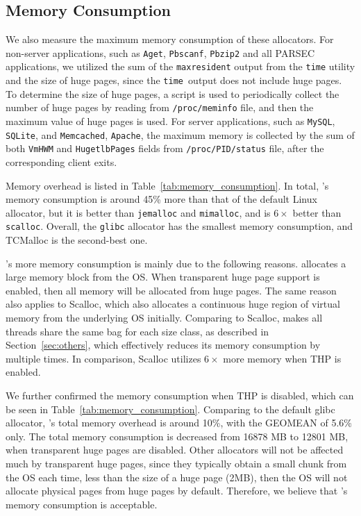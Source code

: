 \subsection{Memory Consumption}
\label{sec:memory}

We also measure the maximum memory consumption of these allocators. For non-server applications, such as \texttt{Aget}, \texttt{Pbscanf}, \texttt{Pbzip2} and all PARSEC applications, we utilized the sum of the \texttt{maxresident} output from the \texttt{time} utility and the size of huge pages, since the \texttt{time }output does not include huge pages. 
To determine the size of huge pages, a script is used to periodically collect the number of huge pages by reading from \texttt{/proc/meminfo} file, and then the maximum value of huge pages is used. 
For server applications, such as \texttt{MySQL}, \texttt{SQLite}, and \texttt{Memcached}, \texttt{Apache}, the maximum memory is collected by the sum of both \texttt{VmHWM} and \texttt{HugetlbPages} fields from \texttt{/proc/PID/status} file, after the corresponding client exits. 


% 

Memory overhead is listed in Table~\ref{tab:memory_consumption}. In total, \NM{}'s memory consumption is around 45\% more than that of the default Linux allocator, but it is better than \texttt{jemalloc} and  \texttt{mimalloc}, and is $6\times$ better than \texttt{scalloc}.  Overall, the \texttt{glibc} allocator has the smallest memory consumption, and TCMalloc is the second-best one. 
 
\NM{}'s more memory consumption is mainly due to the following reasons. \NM{} allocates a large memory block from the OS. When transparent huge page support is enabled, then all memory will be allocated from huge pages. The same reason also applies to Scalloc, which also allocates a continuous huge region of virtual memory from the underlying OS initially. Comparing to Scalloc, \NM{} makes all threads share the same bag for each size class, as described in Section~\ref{sec:others}, which effectively reduces its memory consumption by multiple times. In comparison, Scalloc utilizes $6\times$ more memory when THP is enabled.  

We further confirmed the memory consumption when THP is disabled, which can be seen in Table~\ref{tab:memory_consumption}. Comparing to the default glibc allocator, \NM{}'s total memory overhead is around 10\%, with the GEOMEAN of 5.6\% only. The total memory consumption is decreased from 16878 MB to 12801 MB,  when transparent huge pages are disabled. Other allocators will not be affected much by transparent huge pages, since they typically obtain a small chunk from the OS each time, less than the size of a huge page (2MB), then the OS will not allocate physical pages from huge pages by default.  
Therefore, we believe that \NM{}'s memory consumption is acceptable. 

